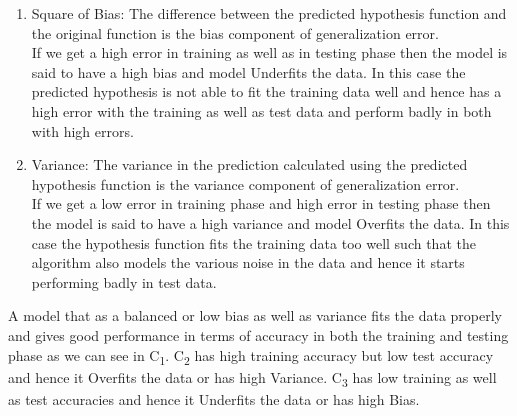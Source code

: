 \documentclass[12pt,letterpaper]{article}
\begin{document}
\begin{enumerate}
    \item Square of Bias: The difference between the predicted hypothesis function and the original function is the bias component of generalization error. \\
    If we get a high error in training as well as in testing phase then the model is said to have a high bias and model Underfits the data. In this case the predicted hypothesis is not able to fit the training data well and hence has a high error with the training as well as test data and perform badly in both with high errors.
    \item Variance: The variance in the prediction calculated using the predicted hypothesis function is the variance component of generalization error. \\
    If we get a low error in training phase and high error in testing phase then the model is said to have a high variance and model Overfits the data. In this case the hypothesis function fits the training data too well such that the algorithm also models the various noise in the data and hence it starts performing badly in test data.
\end{enumerate}

A model that as a balanced or low bias as well as variance fits the data properly and gives good performance in terms of accuracy in both the training and testing phase as we can see in C\textsubscript{1}. 
C\textsubscript{2} has high training accuracy but low test accuracy and hence it Overfits the data or has high Variance.
C\textsubscript{3} has low training as well as test accuracies and hence it Underfits the data or has high Bias.
\end{document}
